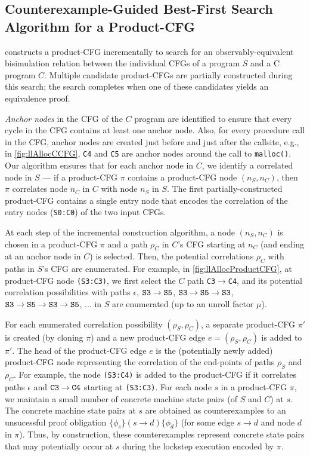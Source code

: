 \subsection{Counterexample-Guided Best-First Search Algorithm for a Product-CFG}
\label{sec:searchAlgoFormal}

\toolName{} constructs a product-CFG incrementally to search for
an observably-equivalent bisimulation relation between
the individual CFGs of a \SpecL{} program $S$ and a C program $C$.
Multiple candidate product-CFGs are partially constructed
during this search; the search completes when one of these
candidates yields an equivalence proof.

{\em Anchor nodes} in the CFG of the $C$ program
are identified to ensure that every cycle in the CFG
contains at least one anchor node. Also, for
every procedure call in the CFG, anchor nodes
are created just before and just after the callsite, e.g.,
in \cref{fig:llAllocCCFG}, {\tt C4} and {\tt C5} are anchor
nodes around the call to {\tt malloc()}.
Our algorithm
ensures that for each anchor node in $C$, we
identify a correlated node in $S$ --- if
a product-CFG $\pi$
contains a product-CFG node $(n_S,n_C)$, then $\pi$
correlates node $n_C$
in $C$ with node $n_S$ in $S$.
The
first partially-constructed product-CFG
contains a single entry node
that encodes the correlation of the entry nodes ({\tt S0:C0})
of the two input CFGs.

At each step of the incremental construction algorithm,
a node $(n_S,n_C)$ is chosen in a product-CFG $\pi$
and a path $\rho_C$ in $C$'s CFG starting at $n_C$ (and
ending at an anchor node in $C$) is selected.
Then, the potential correlations $\rho_C$
with paths
in $S$'s CFG are enumerated.
For
example, in \cref{fig:llAllocProductCFG}, at product-CFG
node {\tt (S3:C3)}, we first select the $C$ path {\tt C3$\rightarrow$C4},
and its potential correlation possibilities
with paths $\epsilon$, ${\tt S3\rightarrow{}S5}$, ${\tt S3\rightarrow{}S5\rightarrow{}S3}$, ${\tt S3\rightarrow{}S5\rightarrow{}S3\rightarrow{}S5}$, ... in $S$ are enumerated (up to an unroll factor $\mu$).

For each enumerated correlation possibility $(\rho_S,\rho_C)$,
a separate
product-CFG $\pi'$ is created (by cloning $\pi$)
and a new product-CFG
edge $e=(\rho_S,\rho_C)$ is added to $\pi'$.
The head of the product-CFG edge $e$ is the
(potentially newly added) product-CFG node representing
the correlation of the end-points of paths $\rho_S$
and $\rho_C$. For example, the node {\tt (S3:C4)} is added
to the product-CFG if it correlates paths $\epsilon$ and ${\tt C3\rightarrow{}C4}$
starting at {\tt (S3:C3)}.
For each node $s$ in a product-CFG $\pi$, we maintain
a small number of
concrete machine state pairs (of $S$ and $C$) at $s$.
The concrete
machine state pairs at $s$
are obtained as
counterexamples to an unsucessful proof
obligation $\{\phi_s\} (s \rightarrow d) \{\phi_d\}$ (for
some edge $s \rightarrow d$ and node $d$ in $\pi$).
Thus, by construction, these counterexamples represent
concrete state pairs that
may potentially occur
at $s$ during the lockstep execution encoded
by $\pi$.

